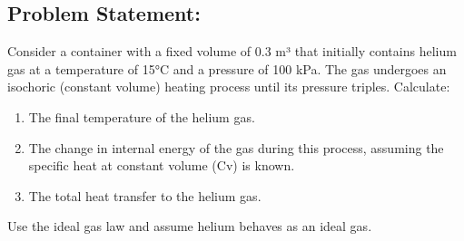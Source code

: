 \documentclass[letterpaper,10pt,english]{jupyterBook}
\begin{document}
\subsection{Problem Statement:}
\label{\detokenize{notebooks/Chapter4/Isochoric_Process_Problem_3:problem-statement}}
\sphinxAtStartPar
Consider a container with a fixed volume of 0.3 m³ that initially contains helium gas at a temperature of 15°C
and a pressure of 100 kPa. The gas undergoes an isochoric (constant volume) heating process until its pressure triples.
Calculate:
\begin{enumerate}
%
\item {} 
\sphinxAtStartPar
The final temperature of the helium gas.

\item {} 
\sphinxAtStartPar
The change in internal energy of the gas during this process, assuming the specific heat at constant volume (Cv) is known.

\item {} 
\sphinxAtStartPar
The total heat transfer to the helium gas.

\end{enumerate}

\sphinxAtStartPar
Use the ideal gas law and assume helium behaves as an ideal gas.
\end{document}

